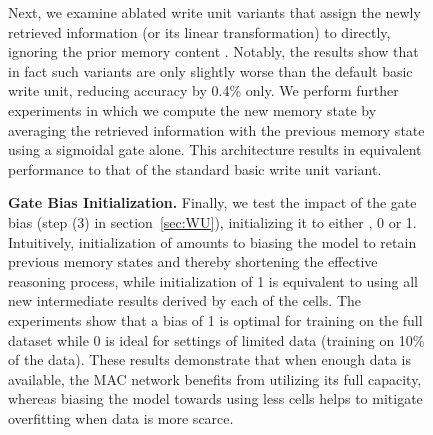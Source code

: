 \documentclass[fleqn]{article}
\newcommand{\secref}[1]{section~\ref{sec:#1}}
\begin{document}
\begin{figure}[t]
\begin{minipage}{0.55\textwidth}
Next, we examine ablated write unit variants that assign the newly retrieved information  (or its linear transformation) to  directly, ignoring the prior memory content . Notably, the results show that in fact such variants are only slightly worse than the default basic write unit, reducing accuracy by 0.4\% only. We perform further experiments in which we compute the new memory state  by averaging the retrieved information  with the previous memory state  using a sigmoidal gate alone. This architecture results in equivalent performance to that of the standard basic write unit variant.

\textbf{Gate Bias Initialization.} Finally, we test the impact of the gate bias (step (3) in \secref{WU}), initializing it to either , 0 or 1. Intuitively, initialization of  amounts to biasing the model to retain previous memory states and thereby shortening  the effective reasoning process, while initialization of 1 is equivalent to using all new intermediate results derived by each of the cells. The experiments show that a bias of 1 is optimal for training on the full dataset while 0 is ideal for settings of limited data (training on 10\% of the data). These results demonstrate that when enough data is available, the MAC network benefits from utilizing its full capacity,  whereas biasing the model towards using less cells helps to mitigate overfitting when data is more scarce. 


\end{minipage}
\end{figure}
\end{document}
